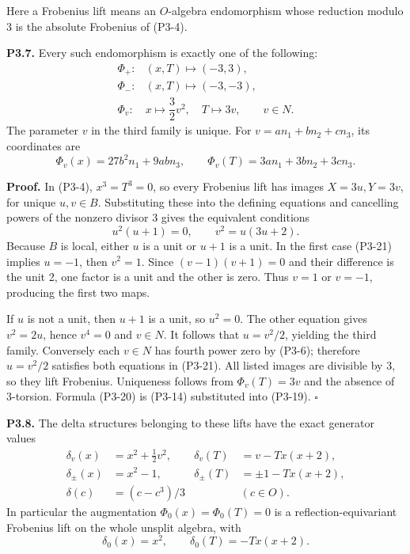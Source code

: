 \documentclass[
]{article}
\begin{document}
Here a Frobenius lift means an \(O\)-algebra endomorphism whose
reduction modulo 3 is the absolute Frobenius of (P3-4).

\textbf{P3.7.} Every such endomorphism is exactly one of the following:
\[
\begin{array}{ll}
\Phi_+:&(x,T)\longmapsto(-3,3),\\
\Phi_-:&(x,T)\longmapsto(-3,-3),\\
\Phi_v:&x\longmapsto\dfrac32v^2,\quad T\longmapsto3v,
\qquad v\in N.
\end{array}
\tag{P3-19}
\] The parameter \(v\) in the third family is unique. For
\(v=an_1+bn_2+cn_3\), its coordinates are \[
\Phi_v(x)=27b^2n_1+9abn_3,\qquad
\Phi_v(T)=3an_1+3bn_2+3cn_3.
\tag{P3-20}
\]

\textbf{Proof.} In (P3-4), \(x^3=T^3=0\), so every Frobenius lift has
images \(X=3u,Y=3v\), for unique \(u,v\in B\). Substituting these into
the defining equations and cancelling powers of the nonzero divisor 3
gives the equivalent conditions \[
u^2(u+1)=0,\qquad v^2=u(3u+2).
\tag{P3-21}
\] Because \(B\) is local, either \(u\) is a unit or \(u+1\) is a unit.
In the first case (P3-21) implies \(u=-1\), then \(v^2=1\). Since
\((v-1)(v+1)=0\) and their difference is the unit 2, one factor is a
unit and the other is zero. Thus \(v=1\) or \(v=-1\), producing the
first two maps.

If \(u\) is not a unit, then \(u+1\) is a unit, so \(u^2=0\). The other
equation gives \(v^2=2u\), hence \(v^4=0\) and \(v\in N\). It follows
that \(u=v^2/2\), yielding the third family. Conversely each \(v\in N\)
has fourth power zero by (P3-6); therefore \(u=v^2/2\) satisfies both
equations in (P3-21). All listed images are divisible by 3, so they lift
Frobenius. Uniqueness follows from \(\Phi_v(T)=3v\) and the absence of
3-torsion. Formula (P3-20) is (P3-14) substituted into (P3-19).
\(\square\)

\textbf{P3.8.} The delta structures belonging to these lifts have the
exact generator values \[
\begin{aligned}
\delta_v(x)&=x^2+\frac12v^2,&
\delta_v(T)&=v-Tx(x+2),\\
\delta_\pm(x)&=x^2-1,&
\delta_\pm(T)&=\pm1-Tx(x+2),\\
\delta(c)&=(c-c^3)/3&& (c\in O).
\end{aligned}
\tag{P3-22}
\] In particular the augmentation \(\Phi_0(x)=\Phi_0(T)=0\) is a
reflection-equivariant Frobenius lift on the whole unsplit algebra, with
\[
\delta_0(x)=x^2,\qquad \delta_0(T)=-Tx(x+2).
\tag{P3-23}
\]
\end{document}
